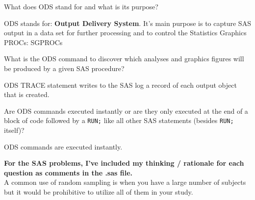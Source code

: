 \documentclass[12pt,answers]{exam}
\begin{document}
\begin{questions}

\question What does ODS stand for and what is its purpose?
\begin{solution}
ODS stands for: \textbf{Output Delivery System}. It's main purpose is to capture SAS output in a data set for further processing and to  control the Statistics Graphics PROCs: SGPROCs
\end{solution}

\pagebreak

\question What is the ODS command to discover which analyses and
graphics figures will be produced by a given SAS procedure?
\begin{solution}
ODS TRACE statement writes to the SAS log a record of each output object that is created.
\end{solution}
\question Are ODS commands executed instantly or are they only
executed at the end of a block of code followed by a {\tt RUN;}
like all other SAS statements (besides {\tt RUN;} itself)?
\begin{solution}
ODS commands are executed instantly.
\end{solution}

\hline
\textbf{For the SAS problems, I've included my thinking / rationale for each
question as comments in the .sas file.}\\
\hline
\question A common use of random sampling is when you have a large number
of subjects but it would be prohibitive to utilize all of them in your
study.  
\begin{parts}

\end{parts}
\end{questions}
\end{document}
